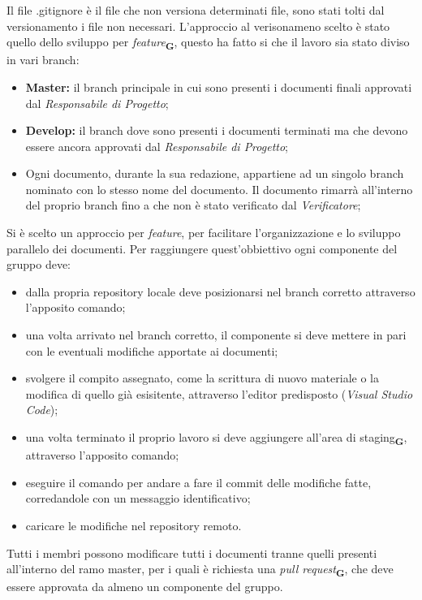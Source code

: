         Il file {\selectfont .gitignore} è il file che non versiona determinati file, sono stati tolti dal versionamento i file non necessari.
        L'approccio al verisonameno scelto è stato quello dello sviluppo per \textit{feature}\textsubscript{\textbf{G}}, questo ha fatto si che il lavoro sia stato diviso in vari branch:
        \begin{itemize}
            \item \textbf{Master:} il branch principale in cui sono presenti i documenti finali approvati dal \textit{Responsabile di Progetto};
            \item \textbf{Develop:} il branch dove sono presenti i documenti terminati ma che devono essere ancora approvati dal \textit{Responsabile di Progetto};
            \item Ogni documento, durante la sua redazione, appartiene ad un singolo branch nominato con lo stesso nome del documento. Il documento rimarrà all'interno del proprio branch fino a che non è stato verificato dal \textit{Verificatore};
        \end{itemize}
        Si è scelto un approccio per \textit{feature}, per facilitare l'organizzazione e lo sviluppo parallelo dei documenti. Per raggiungere quest'obbiettivo ogni componente del gruppo deve:
        \begin{itemize}
            \item dalla propria repository locale deve posizionarsi nel branch corretto attraverso l'apposito comando;
            \item una volta arrivato nel branch corretto, il componente si deve mettere in pari con le eventuali modifiche apportate ai documenti;
            \item svolgere il compito assegnato, come la scrittura di nuovo materiale o la modifica di quello già esisitente, attraverso l'editor predisposto (\textit{Visual Studio Code});
            \item una volta terminato il proprio lavoro si deve aggiungere all'area di staging\textsubscript{\textbf{G}}, attraverso l'apposito comando;
            \item eseguire il comando per andare a fare il commit delle modifiche fatte, corredandole con un messaggio identificativo;
            \item caricare le modifiche nel repository remoto. 
        \end{itemize}
        Tutti i membri possono modificare tutti i documenti tranne quelli presenti all'interno del ramo master, per i quali è richiesta una \textit{pull request}\textsubscript{\textbf{G}}, che deve essere approvata da almeno un componente del gruppo.
